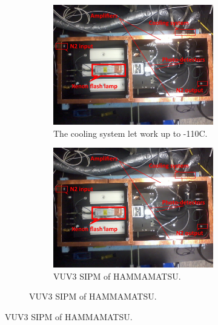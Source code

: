 \documentclass[a4paper, 11pt]{report}%
\begin{document}
\begin{figure}[!hbtp]
  \begin{figure}[!hbtp]
  \centering
  \begin{subfigure}{.5\textwidth}
    \includegraphics[totalheight=.35\textwidth,trim=0cm 7cm 0cm 2.5cm, clip=true,]{../Pictures/blabla/box.jpg}%
    \caption{The cooling system let work up to -110C.}
    \label{fig:beam_splitter}
  \end{subfigure}%
  \begin{subfigure}{.5\textwidth}
    \includegraphics[totalheight=.35\textwidth,trim=0cm 7cm 0cm 2.5cm, clip=true,]{../Pictures/blabla/box.jpg}
    \caption{ VUV3 SIPM of HAMMAMATSU.}
    \label{fig:cooing system}
  \end{subfigure}
  \end{figure}  
  

\end{figure}
\end{document}
